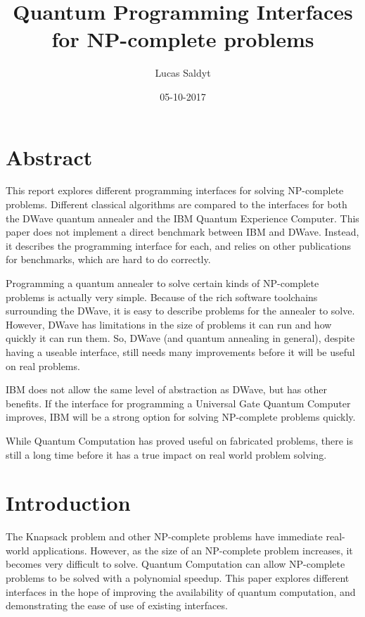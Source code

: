 \documentclass{article}
\title{Quantum Programming Interfaces for NP-complete problems}
\date{05-10-2017}
\author{Lucas Saldyt}
\begin{document}
\maketitle
{}
\newpage
\tableofcontents
\newpage
{}

\section{Abstract}

This report explores different programming interfaces for solving NP-complete problems.
Different classical algorithms are compared to the interfaces for both the DWave quantum annealer and the IBM Quantum Experience Computer.
This paper does not implement a direct benchmark between IBM and DWave.
Instead, it describes the programming interface for each, and relies on other publications for benchmarks, which are hard to do correctly.

Programming a quantum annealer to solve certain kinds of NP-complete problems is actually very simple.
Because of the rich software toolchains surrounding the DWave, it is easy to describe problems for the annealer to solve.
However, DWave has limitations in the size of problems it can run and how quickly it can run them.
So, DWave (and quantum annealing in general), despite having a useable interface, still needs many improvements before it will be useful on real problems.

IBM does not allow the same level of abstraction as DWave, but has other benefits.
If the interface for programming a Universal Gate Quantum Computer improves, IBM will be a strong option for solving NP-complete problems quickly.

While Quantum Computation has proved useful on fabricated problems, there is still a long time before it has a true impact on real world problem solving.

\section{Introduction}

The Knapsack problem and other NP-complete problems have immediate real-world applications. 
However, as the size of an NP-complete problem increases, it becomes very difficult to solve.
Quantum Computation can allow NP-complete problems to be solved with a polynomial speedup.
This paper explores different interfaces in the hope of improving the availability of quantum computation, and demonstrating the ease of use of existing interfaces.
\newpage
\end{document}
